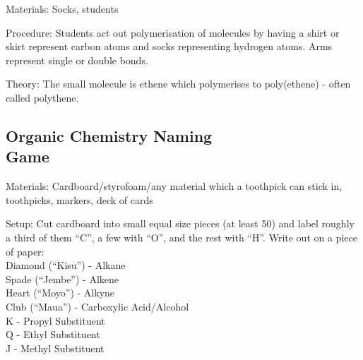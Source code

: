 \begin{multicols}{2}
\begin{description*}
\item[Materials:]{Socks, students}
\item[Procedure:]{Students act out polymerisation of molecules by having a shirt or skirt represent carbon atoms and socks representing hydrogen atoms. Arms represent single or double bonds.}
\item[Theory:]{The small molecule is ethene which polymerises to poly(ethene) - often called polythene.}
\end{description*}

\columnbreak

\subsection{Organic Chemistry Naming \hfill \\ Game}


\begin{description*}
\item[Materials:]{Cardboard/styrofoam/any material which a toothpick can stick in, toothpicks, markers, deck of cards}
\item[Setup:]{Cut cardboard into small equal size pieces (at least 50) and label roughly a third of them ``C'', a few with ``O'', and the rest with ``H''. Write out on a piece of paper:\\

Diamond (``Kisu'') - Alkane\\
Spade (``Jembe'') - Alkene\\
Heart (``Moyo'') - Alkyne\\
Club (``Maua'') - Carboxylic Acid/Alcohol\\

K - Propyl Substituent\\
Q - Ethyl Substituent\\
J - Methyl Substituent \\

}
\end{description*}
\end{multicols}
